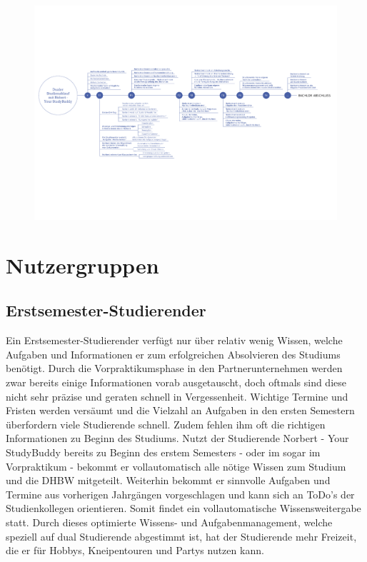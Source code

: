 \newpage
\begin{landscape}
\vspace*{35mm}
	\begin{figure}[H]
	\centering
	\includegraphics[scale=0.75]{images/timeline.pdf}
	\end{figure}

\end{landscape}
\newpage

\section{Nutzergruppen}

\subsection{Erstsemester-Studierender}
Ein Erstsemester-Studierender verfügt nur über relativ wenig Wissen, welche Aufgaben und Informationen er zum erfolgreichen Absolvieren des Studiums benötigt. Durch die Vorpraktikumsphase in den Partnerunternehmen werden zwar bereits einige Informationen vorab ausgetauscht, doch oftmals sind diese nicht sehr präzise und geraten schnell in Vergessenheit. Wichtige Termine und Fristen werden versäumt und die Vielzahl an Aufgaben in den ersten Semestern überfordern viele Studierende schnell. Zudem fehlen ihm oft die richtigen Informationen zu Beginn des Studiums. Nutzt der Studierende Norbert - Your StudyBuddy bereits zu Beginn des erstem Semesters - oder im sogar im Vorpraktikum - bekommt er vollautomatisch alle nötige Wissen zum Studium und die DHBW mitgeteilt. Weiterhin bekommt er sinnvolle Aufgaben und Termine aus vorherigen Jahrgängen vorgeschlagen und kann sich an ToDo's der Studienkollegen orientieren. Somit findet ein vollautomatische Wissensweitergabe statt. Durch dieses optimierte Wissens- und Aufgabenmanagement, welche speziell auf dual Studierende abgestimmt ist, hat der Studierende mehr Freizeit, die er für Hobbys, Kneipentouren und Partys nutzen kann.

